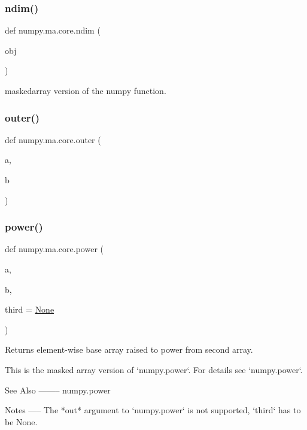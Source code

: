 \subsubsection{\texorpdfstring{ndim()}{ndim()}}
{\footnotesize\ttfamily def numpy.\+ma.\+core.\+ndim (\begin{DoxyParamCaption}\item[{}]{obj }\end{DoxyParamCaption})}

\begin{DoxyVerb}maskedarray version of the numpy function.\end{DoxyVerb}
 \mbox{\label{namespacenumpy_1_1ma_1_1core_a5e630aacd078572db1b4b39a084bff1f}} 
\subsubsection{\texorpdfstring{outer()}{outer()}}
{\footnotesize\ttfamily def numpy.\+ma.\+core.\+outer (\begin{DoxyParamCaption}\item[{}]{a,  }\item[{}]{b }\end{DoxyParamCaption})}

\mbox{\label{namespacenumpy_1_1ma_1_1core_a979aae1af5b20c43516bed04ea64f9b3}} 
\subsubsection{\texorpdfstring{power()}{power()}}
{\footnotesize\ttfamily def numpy.\+ma.\+core.\+power (\begin{DoxyParamCaption}\item[{}]{a,  }\item[{}]{b,  }\item[{}]{third = {\ttfamily \hyperlink{namespacenumpy_1_1ma_1_1core_a647ee1848dfa3692fe35a663a2aa40b3}{None}} }\end{DoxyParamCaption})}

\begin{DoxyVerb}Returns element-wise base array raised to power from second array.

This is the masked array version of `numpy.power`. For details see
`numpy.power`.

See Also
--------
numpy.power

Notes
-----
The *out* argument to `numpy.power` is not supported, `third` has to be
None.\end{DoxyVerb}
 \mbox{\label{namespacenumpy_1_1ma_1_1core_a1ee3a794fd6cc65e3cb0ca8e51ea5f1d}} 
